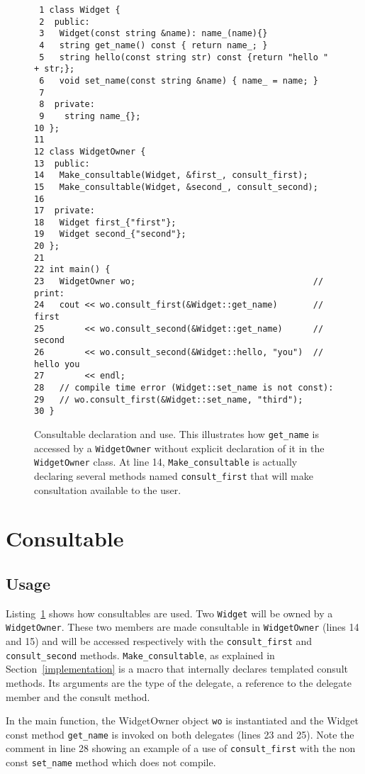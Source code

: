 \documentclass{article}
\begin{document}
\begin{figure}[ht]
{\small
\begin{lstlisting}
 1 class Widget {
 2  public:
 3   Widget(const string &name): name_(name){}
 4   string get_name() const { return name_; }
 5   string hello(const string str) const {return "hello " + str;};
 6   void set_name(const string &name) { name_ = name; }
 7 
 8  private:
 9    string name_{};
10 };
11 
12 class WidgetOwner {
13  public:
14   Make_consultable(Widget, &first_, consult_first);
15   Make_consultable(Widget, &second_, consult_second);
16 
17  private:
18   Widget first_{"first"};
19   Widget second_{"second"};
20 };
21 
22 int main() {
23   WidgetOwner wo;                                   // print:
24   cout << wo.consult_first(&Widget::get_name)       // first
25        << wo.consult_second(&Widget::get_name)      // second
26        << wo.consult_second(&Widget::hello, "you")  // hello you
27        << endl;
28   // compile time error (Widget::set_name is not const):
29   // wo.consult_first(&Widget::set_name, "third");
30 }
\end{lstlisting}}
\cprotect\caption{Consultable declaration and use. This illustrates how \verb+get_name+ is accessed by a \verb+WidgetOwner+ without explicit declaration of it in the \verb+WidgetOwner+ class. At line 14, \verb+Make_consultable+ is actually declaring several methods named \verb+consult_first+ that will make consultation available to the user.}
\label{example:basic}
\end{figure}


\section{Consultable}
\subsection{Usage}

Listing~\ref{example:basic} shows how consultables are used. Two \verb+Widget+ will be owned by a \verb+WidgetOwner+. These two members are made consultable in \verb+WidgetOwner+ (lines 14 and 15) and will be accessed respectively with the \verb+consult_first+ and \verb+consult_second+ methods. \verb+Make_consultable+, as explained in Section~\ref{implementation} is a macro that internally declares templated consult methods. Its arguments are the type of the delegate, a reference to the delegate member and the consult method. 

In the main function, the WidgetOwner object \verb+wo+ is instantiated and the Widget const method \verb+get_name+ is invoked on both delegates (lines 23 and 25). Note the comment in line 28 showing an example of a use of \verb+consult_first+ with the non const \verb+set_name+ method which does not compile. 
\end{document}
